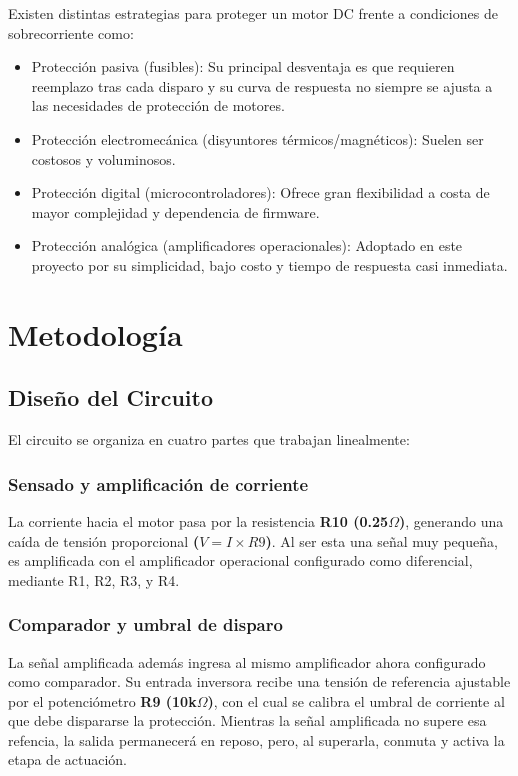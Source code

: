 \documentclass[conference]{IEEEtran}
\begin{document}
Existen distintas estrategias para proteger un motor DC frente a condiciones de sobrecorriente como:

\begin{itemize}
	\item Protección pasiva (fusibles): Su principal desventaja es que requieren reemplazo tras cada disparo y su curva de respuesta no siempre se ajusta a las necesidades de protección de motores.
	\item Protección electromecánica (disyuntores térmicos/magnéticos): Suelen ser costosos y voluminosos.
	\item Protección digital (microcontroladores): Ofrece gran flexibilidad a costa de mayor complejidad y dependencia de firmware.
	\item Protección analógica (amplificadores operacionales): Adoptado en este proyecto por su simplicidad, bajo costo y tiempo de respuesta casi inmediata.
\end{itemize}

\section{Metodología}

\subsection{Diseño del Circuito}
El circuito se organiza en cuatro partes que trabajan linealmente:

\subsubsection{\textbf{Sensado y amplificación de corriente\\}}
La corriente hacia el motor pasa por la resistencia \textbf{R10 (0.25$\Omega$)}, generando una caída de tensión proporcional \textbf{($V=I \times R9$)}. Al ser esta una señal muy pequeña, es amplificada con el amplificador operacional configurado como diferencial, mediante R1, R2, R3, y R4.

\subsubsection{\textbf{Comparador y umbral de disparo\\}}
La señal amplificada además ingresa al mismo amplificador ahora configurado como comparador. Su entrada inversora recibe una tensión de referencia ajustable por el potenciómetro \textbf{R9 (10k$\Omega$)}, con el cual se calibra el umbral de corriente al que debe dispararse la protección.
Mientras la señal amplificada no supere esa refencia, la salida permanecerá en reposo, pero, al superarla, conmuta y activa la etapa de actuación.
\end{document}
